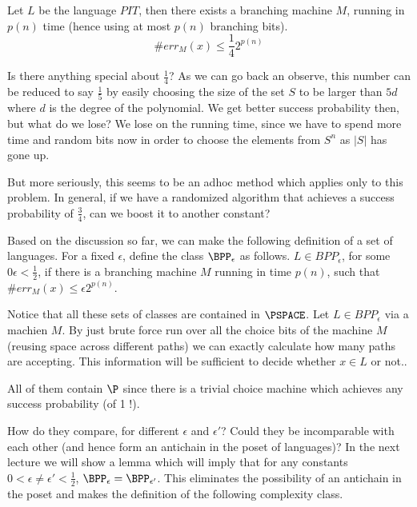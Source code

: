 \begin{corollary}
Let $L$ be the language $PIT$, then there exists a branching machine
$M$, running in $p(n)$ time (hence using at most $p(n)$ branching
bits).
\[ \#err_M(x) \le \frac{1}{4}2^{p(n)} \]
\end{corollary}

Is there anything special about $\frac{1}{4}$? As we can go back an
observe, this number can be reduced to say $\frac{1}{5}$ by easily
choosing the size of the set $S$ to be larger than $5d$ where $d$ is
the degree of the polynomial. We get better success probability then,
but what do we lose? We lose on the running time, since we have to
spend more time and random bits now in order to choose the elements
from $S^n$ as $|S|$ has gone up.

But more seriously, this seems to be an adhoc method which applies
only to this problem. In general, if we have a randomized algorithm
that achieves a success probability of $\frac{3}{4}$, can we boost it
to another constant?

Based on the discussion so far, we can make the following definition
of a set of languages. For a fixed $\epsilon$, define the class $\BPP_\epsilon$ as follows.
$L \in BPP_{\epsilon}$, for some $0 \epsilon < \frac{1}{2}$, if there is a branching machine $M$
running in time $p(n)$, such that $\#err_M(x) \le \epsilon2^{p(n)}$.

Notice that all these sets of classes are contained in $\PSPACE$. Let $L \in
BPP_{\epsilon}$ via a machien $M$.  By just brute force run over all
the choice bits of the machine $M$ (reusing space across different
paths) we can exactly calculate how many paths are accepting. This
information will be sufficient to decide whether $x \in L$ or not..

All of them contain $\P$ since there is a trivial choice machine which
achieves any success probability (of 1 !).

How do they compare, for different $\epsilon$ and $\epsilon'$? Could
they be incomparable with each other (and hence form an antichain in
the poset of languages)? In the next lecture we will show a lemma
which will imply that for any constants $0 < \epsilon \ne \epsilon' <
\frac{1}{2}$, $\BPP_\epsilon = \BPP_{\epsilon'}$.  This eliminates the
possibility of an antichain in the poset and makes the definition of
the following complexity class.

